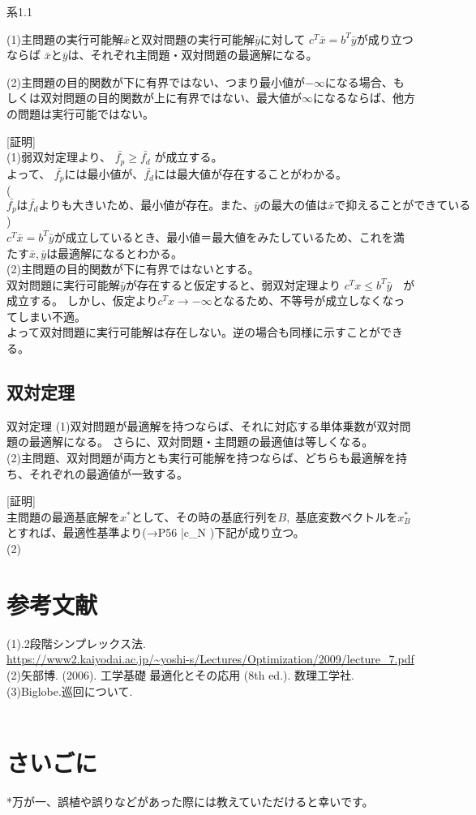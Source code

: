 \documentclass[platex,dvipdfmx]{jlreq}			%
\begin{document}
\begin{itembox}[l]{系1.1}

(1)主問題の実行可能解$\bar{x}$と双対問題の実行可能解$\bar{y}$に対して
$c^T \bar{x} = b^T \bar{y}$が成り立つならば
$\bar{x}$と$\bar{y}$は、それぞれ主問題・双対問題の最適解になる。

(2)主問題の目的関数が下に有界ではない、つまり最小値が$- \infty $になる場合、もしくは双対問題の目的関数が上に有界ではない、最大値が$\infty$になるならば、他方の問題は実行可能ではない。
\end{itembox}
[証明]\\
(1)弱双対定理より、
$
\bar{f_p}  \geq   \bar{f_d}
$
が成立する。\\
よって、 $\bar{f_p}$には最小値が、$\bar{f_d}$には最大値が存在することがわかる。\\
($\bar{f_p}は \bar{f_d}よりも大きいため、最小値が存在。 また、\bar{y}の最大の値は\bar{x}で抑えることができている$)\\
$c^T \bar{x} = b^T \bar{y}$が成立しているとき、最小値＝最大値をみたしているため、これを満たす$\bar{x} , \bar{y}$は最適解になるとわかる。
\\
(2)主問題の目的関数が下に有界ではないとする。\\
双対問題に実行可能解$\bar{y}$が存在すると仮定すると、弱双対定理より
$c^T x  \leq b^T \bar{y}$　が成立する。
しかし、仮定より$c^T x → -\infty$となるため、不等号が成立しなくなってしまい不適。\\
よって双対問題に実行可能解は存在しない。逆の場合も同様に示すことができる。


\subsection*{双対定理}
\begin{itembox}[l]{双対定理}
(1)双対問題が最適解を持つならば、それに対応する単体乗数が双対問題の最適解になる。
さらに、双対問題・主問題の最適値は等しくなる。\\
(2)主問題、双対問題が両方とも実行可能解を持つならば、どちらも最適解を持ち、それぞれの最適値が一致する。
\end{itembox}
[証明]\\
主問題の最適基底解を$x^*$として、その時の基底行列を$B,$ 基底変数ベクトルを$x^*_B$とすれば、最適性基準より(→P56 \quad \bar{c}_N )下記が成り立つ。\\



(2)

\section{参考文献}

(1).2段階シンプレックス法.\\
\url{https://www2.kaiyodai.ac.jp/~yoshi-s/Lectures/Optimization/2009/lecture_7.pdf}\\
 \quad (2)矢部博. (2006). 工学基礎 最適化とその応用 (8th ed.). 数理工学社.\\
 \quad(3)Biglobe.巡回について.
\\
\\
\section*{さいごに}
*万が一、誤植や誤りなどがあった際には教えていただけると幸いです。
\end{document}
